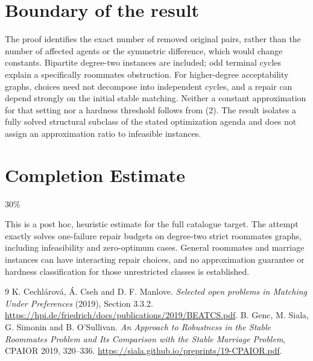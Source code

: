 \documentclass[11pt]{article}
\theoremstyle{definition}
\begin{document}
\section*{Boundary of the result}
The proof identifies the exact number of removed original pairs, rather
than the number of affected agents or the symmetric difference, which
would change constants. Bipartite degree-two instances are included;
odd terminal cycles explain a specifically roommates obstruction.
For higher-degree acceptability graphs, choices need not decompose into
independent cycles, and a repair can depend strongly on the initial stable
matching. Neither a constant approximation for that setting nor a hardness
threshold follows from (2). The result isolates a fully solved structural
subclass of the stated optimization agenda and does not assign an
approximation ratio to infeasible instances.

\section{Completion Estimate}
30\%

This is a post hoc, heuristic estimate for the full catalogue target.
The attempt exactly solves one-failure repair budgets on degree-two strict roommates graphs, including infeasibility and zero-optimum cases. General roommates and marriage instances can have interacting repair choices, and no approximation guarantee or hardness classification for those unrestricted classes is established.

\begin{thebibliography}{9}
 K. Cechl\'arov\'a, \'A. Cseh and D. F. Manlove.
\emph{Selected open problems in Matching Under Preferences} (2019), Section 3.3.2.
\url{https://hpi.de/friedrich/docs/publications/2019/BEATCS.pdf}.
 B. Genc, M. Siala, G. Simonin and B. O'Sullivan.
\emph{An Approach to Robustness in the Stable Roommates Problem and Its
Comparison with the Stable Marriage Problem}, CPAIOR 2019, 320--336.
\url{https://siala.github.io/preprints/19-CPAIOR.pdf}.
\end{thebibliography}
\end{document}
